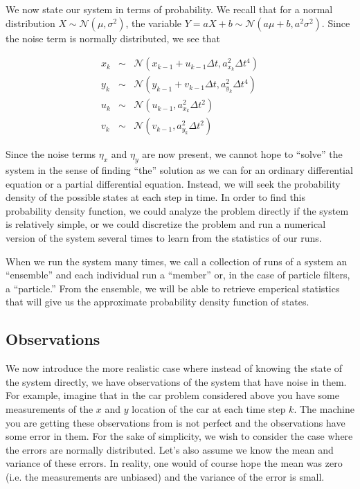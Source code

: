 \documentclass{article}
\begin{document}
We now state our system in terms of probability.  We recall that for a normal
distribution $X \sim \mathcal{N}(\mu, \sigma^2)$, the variable 
$Y = aX + b \sim \mathcal{N}(a\mu + b, a^2\sigma^2)$.  Since the noise term is 
normally distributed, we see that

\[
\begin{array}{rcl}
x_k & \sim & \mathcal{N}(x_{k-1} + u_{k-1} \Delta t, a_{x_k}^2 \Delta t^4) \\
y_k & \sim & \mathcal{N}(y_{k-1} + v_{k-1} \Delta t, a_{y_k}^2 \Delta t^4) \\
u_k & \sim & \mathcal{N}(u_{k-1}, a_{x_k}^2 \Delta t^2) \\
v_k & \sim & \mathcal{N}(v_{k-1}, a_{y_k}^2 \Delta t^2)
\end{array}\]

Since the noise terms $\eta_x$ and $\eta_y$ are now present, we cannot 
hope to ``solve'' the system in the sense of finding ``the'' solution as we 
can for an ordinary differential equation or a partial 
differential equation.  Instead, we will seek the probability density of the 
possible states at each step in time.  In order to
find this probability density function, we could analyze the problem directly
if the system is relatively simple, or we could discretize the problem and run 
a numerical version of the system several times to learn from the statistics of
our runs.  

When we run the system many times, we call a collection of runs of a system 
an ``ensemble'' and each individual run a ``member'' or, in the case of 
particle filters, a ``particle.''  From the ensemble, we will be able to
retrieve emperical statistics that will give us the approximate probability 
density function of states.

\subsection{Observations}

We now introduce the more realistic case where instead of knowing the state 
of the system directly, we have observations of the system that have noise
in them.  For example, imagine that in the car problem considered above you 
have some measurements of the $x$ and $y$ location of the car at each time
step $k$.  The machine you are getting these observations from is not 
perfect and the observations have some error in them.  For the sake of 
simplicity, we wish to consider the case where the errors are normally 
distributed.  Let's also assume we know the mean and variance of these errors.
In reality, one would of course hope the mean was zero (i.e. the measurements 
are unbiased) and the variance of the error is small.
\end{document}
